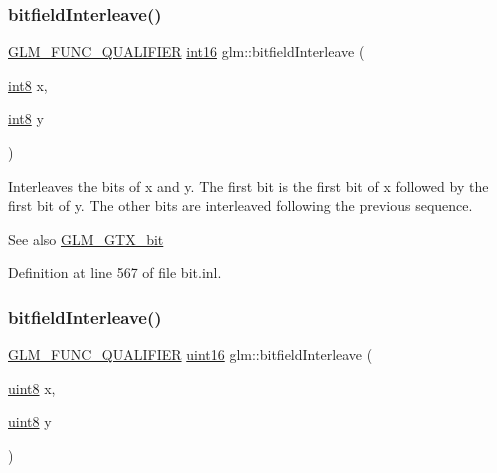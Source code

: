 \subsubsection{\texorpdfstring{bitfield\+Interleave()}{bitfieldInterleave()}\hspace{0.1cm}{\footnotesize\ttfamily [1/16]}}
{\footnotesize\ttfamily \hyperlink{setup_8hpp_a33fdea6f91c5f834105f7415e2a64407}{G\+L\+M\+\_\+\+F\+U\+N\+C\+\_\+\+Q\+U\+A\+L\+I\+F\+I\+ER} \hyperlink{group__gtc__type__precision_ga2945a61d12771f8954994fcddf02b021}{int16} glm\+::bitfield\+Interleave (\begin{DoxyParamCaption}\item[{\hyperlink{group__gtc__type__precision_ga96254f9c1c4506fc8eb5cf3301ce8565}{int8}}]{x,  }\item[{\hyperlink{group__gtc__type__precision_ga96254f9c1c4506fc8eb5cf3301ce8565}{int8}}]{y }\end{DoxyParamCaption})}

Interleaves the bits of x and y. The first bit is the first bit of x followed by the first bit of y. The other bits are interleaved following the previous sequence.

\begin{DoxySeeAlso}{See also}
\hyperlink{group__gtx__bit}{G\+L\+M\+\_\+\+G\+T\+X\+\_\+bit} 
\end{DoxySeeAlso}


Definition at line 567 of file bit.\+inl.

\mbox{\label{group__gtx__bit_ga0700a3ceb088a0ecc23d76c154096061}} 
\subsubsection{\texorpdfstring{bitfield\+Interleave()}{bitfieldInterleave()}\hspace{0.1cm}{\footnotesize\ttfamily [2/16]}}
{\footnotesize\ttfamily \hyperlink{setup_8hpp_a33fdea6f91c5f834105f7415e2a64407}{G\+L\+M\+\_\+\+F\+U\+N\+C\+\_\+\+Q\+U\+A\+L\+I\+F\+I\+ER} \hyperlink{group__gtc__type__precision_gad8c2939e1fdd8e5828b31d95c52255d5}{uint16} glm\+::bitfield\+Interleave (\begin{DoxyParamCaption}\item[{\hyperlink{group__gtc__type__precision_ga1a7dcd8aac97cc8020817c94049deff2}{uint8}}]{x,  }\item[{\hyperlink{group__gtc__type__precision_ga1a7dcd8aac97cc8020817c94049deff2}{uint8}}]{y }\end{DoxyParamCaption})}

